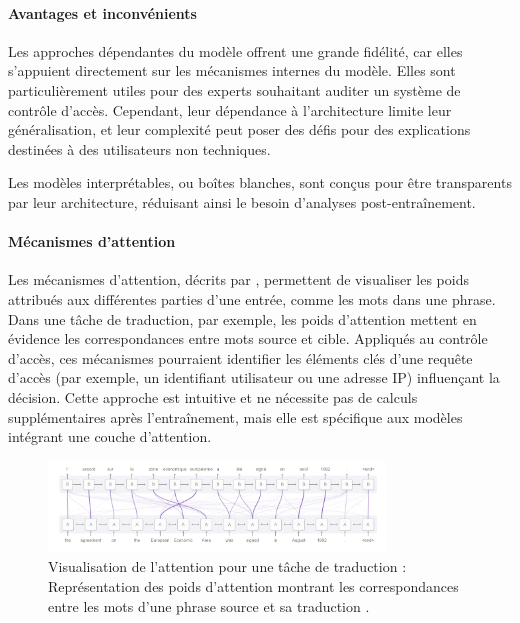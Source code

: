\paragraph{Avantages et inconvénients}  
Les approches dépendantes du modèle offrent une grande fidélité, car elles s’appuient directement sur les mécanismes internes du modèle. Elles sont particulièrement utiles pour des experts souhaitant auditer un système de contrôle d’accès. Cependant, leur dépendance à l’architecture limite leur généralisation, et leur complexité peut poser des défis pour des explications destinées à des utilisateurs non techniques.


Les modèles interprétables, ou boîtes blanches, sont conçus pour être transparents par leur architecture, réduisant ainsi le besoin d’analyses post-entraînement.

\paragraph{Mécanismes d’attention}  
Les mécanismes d’attention, décrits par \cite{lin2017structured}, permettent de visualiser les poids attribués aux différentes parties d’une entrée, comme les mots dans une phrase. Dans une tâche de traduction, par exemple, les poids d’attention mettent en évidence les correspondances entre mots source et cible. Appliqués au contrôle d’accès, ces mécanismes pourraient identifier les éléments clés d’une requête d’accès (par exemple, un identifiant utilisateur ou une adresse IP) influençant la décision. Cette approche est intuitive et ne nécessite pas de calculs supplémentaires après l’entraînement, mais elle est spécifique aux modèles intégrant une couche d’attention.



\begin{figure}[h]
    \centering
    \includegraphics[width=0.8\textwidth]{My-Thesis/Chap1/images/attention_visualization.png}
    \caption{Visualisation de l’attention pour une tâche de traduction : Représentation des poids d’attention montrant les correspondances entre les mots d’une phrase source et sa traduction \cite{lin2017structured}.}
    \label{fig:attention}
\end{figure}

